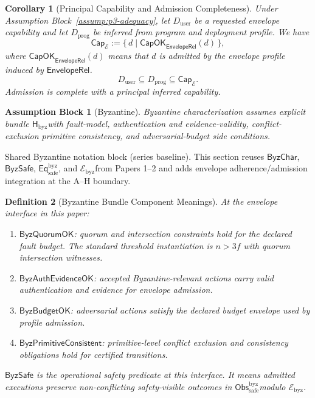 \documentclass[a4paper,10pt,twocolumn,english]{article}
\numberwithin{equation}{section}
\theoremstyle{paperdef}
\newtheorem{definition}{Definition}[section]
\theoremstyle{paperplain}
\newtheorem{corollary}[definition]{Corollary}
\theoremstyle{paperdef}
\theoremstyle{paperremark}
\theoremstyle{paperdef}
\newtheorem{assumptions}[assumption]{Assumption Block}
\newcommand{\Hbyz}{\ensuremath{\mathsf{H}_{\mathrm{byz}}}}
\newcommand{\Obssafe}{\ensuremath{\mathsf{Obs}_{\mathrm{safe}}^{\mathrm{byz}}}}
\newcommand{\Eqsafe}{\ensuremath{\mathsf{Eq}_{\mathrm{safe}}^{\mathrm{byz}}}}
\newcommand{\Ebyz}{\ensuremath{\mathcal{E}_{\mathrm{byz}}}}
\newcommand{\ByzSafe}{\ensuremath{\mathsf{ByzSafe}}}
\newcommand{\ByzChar}{\ensuremath{\mathsf{ByzChar}}}
\newcommand{\EnvelopeRel}{\ensuremath{\mathsf{EnvelopeRel}}}
\begin{document}
\begin{corollary}[Principal Capability and Admission Completeness]
	\label{cor:principal}
	Under Assumption Block~\ref{assump:p3-adequacy}, let $D_{\text{user}}$ be a requested envelope capability and let $D_{\text{prog}}$ be inferred from program and deployment profile. We have
	\[
		\mathsf{Cap}_{\mathcal{E}} := \{\, d \mid \mathsf{CapOK}_{\EnvelopeRel}(d)\,\},
	\]
	where $\mathsf{CapOK}_{\EnvelopeRel}(d)$ means that $d$ is admitted by the envelope profile induced by \EnvelopeRel.
	\begin{equation}
		D_{\text{user}} \subseteq D_{\text{prog}} \subseteq \mathsf{Cap}_{\mathcal{E}}.
	\end{equation}
	Admission is complete with a principal inferred capability.
\end{corollary}

\begin{assumptions}[Byzantine]
	\label{assump:p3-byzantine}
	Byzantine characterization assumes explicit bundle \Hbyz with fault-model, authentication and evidence-validity, conflict-exclusion primitive consistency, and adversarial-budget side conditions.
\end{assumptions}

Shared Byzantine notation block (series baseline). This section reuses
$\ByzChar$, $\ByzSafe$, \Eqsafe, and \Ebyz from Papers 1--2 and adds envelope
adherence/admission integration at the A--H boundary.

\begin{definition}[Byzantine Bundle Component Meanings]
	At the envelope interface in this paper:
	\begin{enumerate}
		\item $\mathsf{ByzQuorumOK}$: quorum and intersection constraints hold for the declared fault budget. The standard threshold instantiation is $n>3f$ with quorum intersection witnesses.
		\item $\mathsf{ByzAuthEvidenceOK}$: accepted Byzantine-relevant actions carry valid authentication and evidence for envelope admission.
		\item $\mathsf{ByzBudgetOK}$: adversarial actions satisfy the declared budget envelope used by profile admission.
		\item $\mathsf{ByzPrimitiveConsistent}$: primitive-level conflict exclusion and consistency obligations hold for certified transitions.
	\end{enumerate}
	$\ByzSafe$ is the operational safety predicate at this interface. It means admitted executions preserve non-conflicting safety-visible outcomes in \Obssafe modulo \Ebyz.
\end{definition}
\end{document}
